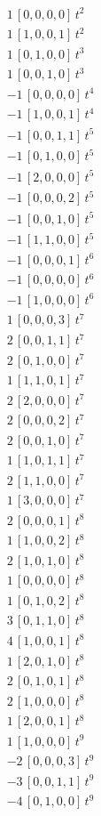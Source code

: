 \begin{align*}
1\,[0,0,0,0]\,t^{2} \\
1\,[1,0,0,1]\,t^{2} \\
1\,[0,1,0,0]\,t^{3} \\
1\,[0,0,1,0]\,t^{3} \\
-1\,[0,0,0,0]\,t^{4} \\
-1\,[1,0,0,1]\,t^{4} \\
-1\,[0,0,1,1]\,t^{5} \\
-1\,[0,1,0,0]\,t^{5} \\
-1\,[2,0,0,0]\,t^{5} \\
-1\,[0,0,0,2]\,t^{5} \\
-1\,[0,0,1,0]\,t^{5} \\
-1\,[1,1,0,0]\,t^{5} \\
-1\,[0,0,0,1]\,t^{6} \\
-1\,[0,0,0,0]\,t^{6} \\
-1\,[1,0,0,0]\,t^{6} \\
1\,[0,0,0,3]\,t^{7} \\
2\,[0,0,1,1]\,t^{7} \\
2\,[0,1,0,0]\,t^{7} \\
1\,[1,1,0,1]\,t^{7} \\
2\,[2,0,0,0]\,t^{7} \\
2\,[0,0,0,2]\,t^{7} \\
2\,[0,0,1,0]\,t^{7} \\
1\,[1,0,1,1]\,t^{7} \\
2\,[1,1,0,0]\,t^{7} \\
1\,[3,0,0,0]\,t^{7} \\
2\,[0,0,0,1]\,t^{8} \\
1\,[1,0,0,2]\,t^{8} \\
2\,[1,0,1,0]\,t^{8} \\
1\,[0,0,0,0]\,t^{8} \\
1\,[0,1,0,2]\,t^{8} \\
3\,[0,1,1,0]\,t^{8} \\
4\,[1,0,0,1]\,t^{8} \\
1\,[2,0,1,0]\,t^{8} \\
2\,[0,1,0,1]\,t^{8} \\
2\,[1,0,0,0]\,t^{8} \\
1\,[2,0,0,1]\,t^{8} \\
1\,[1,0,0,0]\,t^{9} \\
-2\,[0,0,0,3]\,t^{9} \\
-3\,[0,0,1,1]\,t^{9} \\
-4\,[0,1,0,0]\,t^{9} \\

\end{align*}
